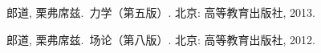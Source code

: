 \begin{thebibliography}{9}

{郎道, 栗弗席兹.}\, 力学（第五版）. 北京: 高等教育出版社, 2013.

{郎道, 栗弗席兹.}\, 场论（第八版）. 北京: 高等教育出版社, 2012.

\end{thebibliography}
